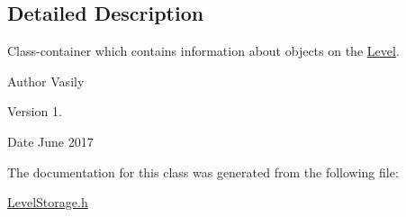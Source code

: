 \subsection{Detailed Description}
Class-\/container which contains information about objects on the \hyperlink{class_level}{Level}. 

\begin{DoxyAuthor}{Author}
Vasily 
\end{DoxyAuthor}
\begin{DoxyVersion}{Version}
1. 
\end{DoxyVersion}
\begin{DoxyDate}{Date}
June 2017 
\end{DoxyDate}


The documentation for this class was generated from the following file\+:\begin{DoxyCompactItemize}
\item 
\hyperlink{_level_storage_8h}{Level\+Storage.\+h}\end{DoxyCompactItemize}
